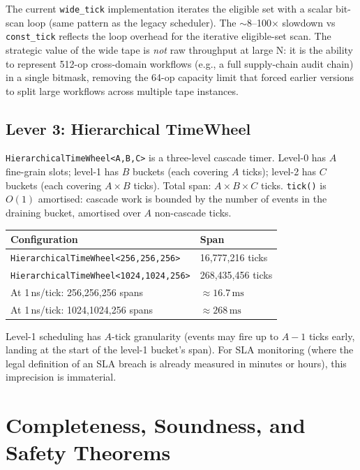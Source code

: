 \documentclass[12pt,a4paper]{article}
\theoremstyle{definition}
\theoremstyle{remark}
\begin{document}
The current \texttt{wide\_tick} implementation iterates the eligible set with a
scalar bit-scan loop (same pattern as the legacy scheduler).
The $\sim$8--100$\times$ slowdown vs \texttt{const\_tick} reflects the loop overhead
for the iterative eligible-set scan.
The strategic value of the wide tape is \emph{not} raw throughput at large N:
it is the ability to represent 512-op cross-domain workflows (e.g., a full
supply-chain audit chain) in a single bitmask, removing the 64-op capacity limit
that forced earlier versions to split large workflows across multiple tape instances.

\subsection{Lever 3: Hierarchical TimeWheel}

\texttt{HierarchicalTimeWheel<A,B,C>} is a three-level cascade timer.
Level-0 has $A$ fine-grain slots; level-1 has $B$ buckets (each covering $A$ ticks);
level-2 has $C$ buckets (each covering $A \times B$ ticks).
Total span: $A \times B \times C$ ticks.
\texttt{tick()} is $O(1)$ amortised: cascade work is bounded by the number of events
in the draining bucket, amortised over $A$ non-cascade ticks.

\begin{center}
\renewcommand{\arraystretch}{1.12}
\begin{tabular}{ll}
\toprule
\textbf{Configuration} & \textbf{Span} \\
\midrule
\texttt{HierarchicalTimeWheel<256,256,256>} & 16,777,216 ticks \\
\texttt{HierarchicalTimeWheel<1024,1024,256>} & 268,435,456 ticks \\
At 1\,ns/tick: 256,256,256 spans & $\approx 16.7\,\text{ms}$ \\
At 1\,ns/tick: 1024,1024,256 spans & $\approx 268\,\text{ms}$ \\
\bottomrule
\end{tabular}
\end{center}

Level-1 scheduling has $A$-tick granularity (events may fire up to $A-1$ ticks
early, landing at the start of the level-1 bucket's span).
For SLA monitoring (where the legal definition of an SLA breach is already measured
in minutes or hours), this imprecision is immaterial.

\section{Completeness, Soundness, and Safety Theorems}
\label{sec:soundness}
\end{document}
